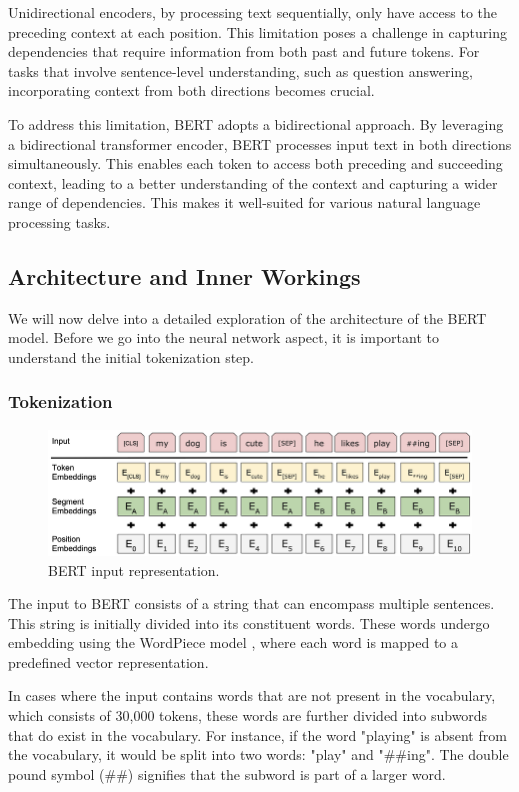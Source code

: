 \documentclass[12pt,oneside,bibtotoc,liststotoc]{scrbook}
\begin{document}
Unidirectional encoders, by processing text sequentially, only have access to the preceding context at each position. This limitation poses a challenge in capturing dependencies that require information from both past and future tokens. For tasks that involve sentence-level understanding, such as question answering, incorporating context from both directions becomes crucial.

To address this limitation, BERT adopts a bidirectional approach. By leveraging a bidirectional transformer encoder, BERT processes input text in both directions simultaneously. This enables each token to access both preceding and succeeding context, leading to a better understanding of the context and capturing a wider range of dependencies. This makes it well-suited for various natural language processing tasks. \cite{bert}


\subsection{Architecture and Inner Workings}
We will now delve into a detailed exploration of the architecture of the BERT model. Before we go into the neural network aspect, it is important to understand the initial tokenization step.

\subsubsection{Tokenization}
\begin{figure}
  \centering
  \includegraphics[width=12cm]{img/bert_input_representation.png}
  \caption{BERT input representation. \cite{bert}}
  \label{fig:bert_input_representation}
\end{figure}
The input to BERT consists of a string that can encompass multiple sentences. This string is initially divided into its constituent words. These words undergo embedding using the WordPiece model \cite{wordpiece}, where each word is mapped to a predefined vector representation.

In cases where the input contains words that are not present in the vocabulary, which consists of 30,000 tokens, these words are further divided into subwords that do exist in the vocabulary. For instance, if the word "playing" is absent from the vocabulary, it would be split into two words: "play" and "\#\#ing". The double pound symbol (\#\#) signifies that the subword is part of a larger word.
\end{document}
